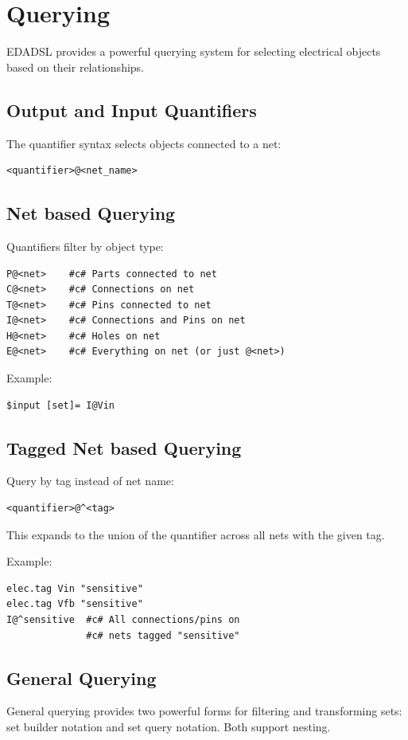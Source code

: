 \chapter{Querying}
EDADSL provides a powerful querying system for selecting electrical objects based on their relationships.

\section{Output and Input Quantifiers}
The quantifier syntax selects objects connected to a net:
\begin{verbatim}
<quantifier>@<net_name>
\end{verbatim}

\section{Net based Querying}
Quantifiers filter by object type:
\begin{verbatim}
P@<net>    #c# Parts connected to net
C@<net>    #c# Connections on net
T@<net>    #c# Pins connected to net
I@<net>    #c# Connections and Pins on net
H@<net>    #c# Holes on net
E@<net>    #c# Everything on net (or just @<net>)
\end{verbatim}

Example:
\begin{verbatim}
$input [set]= I@Vin
\end{verbatim}

\section{Tagged Net based Querying}
Query by tag instead of net name:
\begin{verbatim}
<quantifier>@^<tag>
\end{verbatim}
This expands to the union of the quantifier across all nets with the given tag.

Example:
\begin{verbatim}
elec.tag Vin "sensitive"
elec.tag Vfb "sensitive"
I@^sensitive  #c# All connections/pins on 
              #c# nets tagged "sensitive"
\end{verbatim}

\section{General Querying}
\label{sec:general-querying}
General querying provides two powerful forms for filtering and transforming sets: set builder notation and set query notation. Both support nesting.

